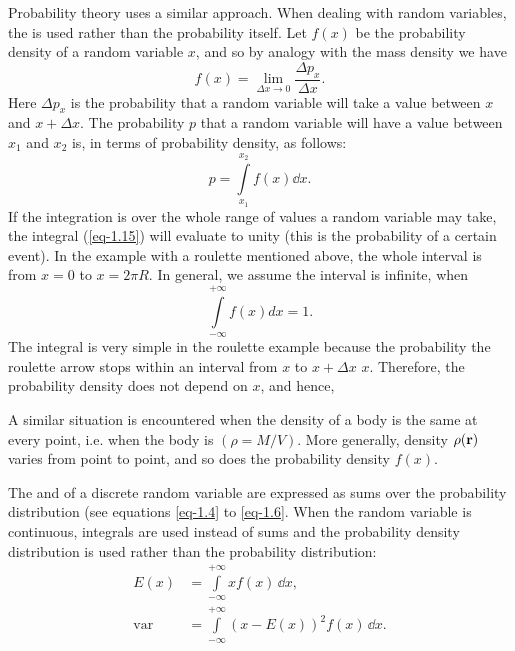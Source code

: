 Probability theory uses a similar approach. When dealing with
 random variables, the  is used rather than the probability itself. Let $f(x)$ be the probability density of a random variable $x$, and so by analogy with the mass density we have
\begin{equation*}%
f(x) = \lim_{\Delta x \to 0 }   \frac{\Delta p_{x}}{\Delta x}.
\end{equation*}
Here $\Delta p_{x}$ is the probability that a random variable will take a value
between $x$ and $x + \Delta x$. The probability $p$ that a random variable will
have a value between $x_{1}$ and $x_{2}$ is, in terms of probability density, as
follows:
\begin{equation}%
p = \int\limits_{x_{1}}^{x_{2}} f(x) \dd x.
\label{eq-1.15}
\end{equation}
If the integration is over the whole range of values a random variable
may take, the integral (\ref{eq-1.15}) will evaluate to unity (this is the probability of a certain event). In the example with a roulette mentioned above,
the whole interval is from $x = 0$ to $x = 2 \pi R$. In general, we assume the
interval is infinite, when 
\begin{equation}%
 \int\limits_{- \infty}^{+ \infty} f(x) dx = 1.
\label{eq-1.16}
\end{equation}
The integral is very simple in the roulette example because the
probability the roulette arrow stops within an interval from $x$ to $x
+ \Delta x$  $x$. Therefore, the probability
density does not depend on $x$, and hence,


A similar situation is encountered when the density of a body is the
same at every point, i.e. when the body is  $(\rho = M/V)$. More
generally, density $\rho (\vb{r})$ varies from point to point, and so does the
probability density $f (x)$.


 The  and  of a discrete random
variable are expressed as sums over the probability distribution (see
equations \eqref{eq-1.4} to \eqref{eq-1.6}. When the random variable is
continuous, integrals are used instead of sums and the probability
density distribution is used rather than the probability distribution:
\begin{align}%
E(x) & =  \int\limits_{- \infty}^{+ \infty} x f(x) \, \dd x, 
\label{eq-1.17}\\
\text{var} & =  \int\limits_{- \infty}^{+ \infty} (x - E(x))^{2} f(x) \, \dd x.
\label{eq-1.18}
\end{align}

